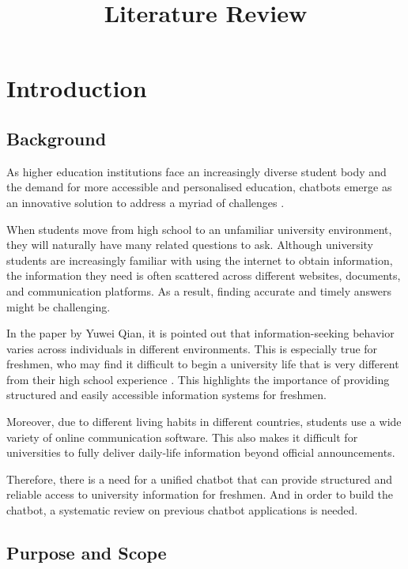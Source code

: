 \documentclass[12pt,a4paper]{article}
\title{\textbf{Literature Review}}
\author{}
\date{}
\begin{document}
\maketitle

\section{Introduction}

\subsection{Background}

As higher education institutions face an increasingly diverse student body and the demand for more accessible and personalised education, chatbots emerge as an innovative solution to address a myriad of challenges \cite{martinez2024}.

When students move from high school to an unfamiliar university environment, they will naturally have many related questions to ask. Although university students are increasingly familiar with using the internet to obtain information, the information they need is often scattered across different websites, documents, and communication platforms. As a result, finding accurate and timely answers might be challenging.

In the paper by Yuwei Qian, it is pointed out that information-seeking behavior varies across individuals in different environments. This is especially true for freshmen, who may find it difficult to begin a university life that is very different from their high school experience \cite{qian2019}. This highlights the importance of providing structured and easily accessible information systems for freshmen.

Moreover, due to different living habits in different countries, students use a wide variety of online communication software. This also makes it difficult for universities to fully deliver daily-life information beyond official announcements.

Therefore, there is a need for a unified chatbot that can provide structured and reliable access to university information for freshmen. And in order to build the chatbot, a systematic review on previous chatbot applications is needed.

\subsection{Purpose and Scope}
\end{document}

